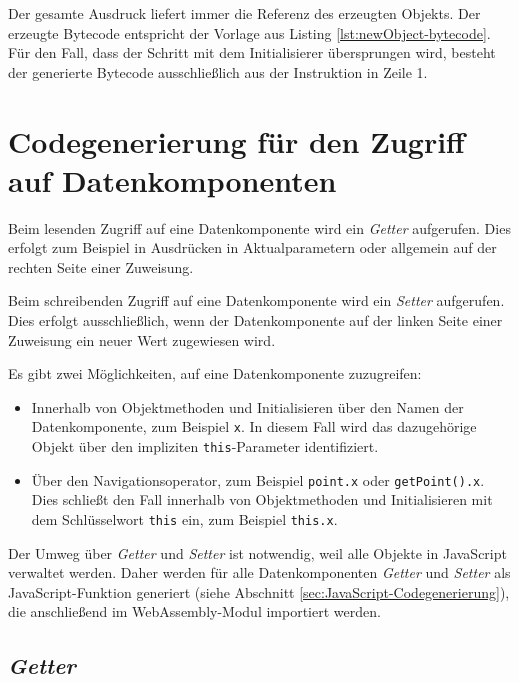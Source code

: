 Der gesamte Ausdruck liefert immer die Referenz des erzeugten Objekts. Der erzeugte Bytecode entspricht der Vorlage aus Listing \ref{lst:newObject-bytecode}. Für den Fall, dass der Schritt mit dem Initialisierer übersprungen wird, besteht der generierte Bytecode ausschließlich aus der Instruktion in Zeile 1.



\section{Codegenerierung für den Zugriff auf Datenkomponenten}

Beim lesenden Zugriff auf eine Datenkomponente wird ein \emph{Getter} aufgerufen. Dies erfolgt zum Beispiel in Ausdrücken in Aktualparametern oder allgemein auf der rechten Seite einer Zuweisung.

Beim schreibenden Zugriff auf eine Datenkomponente wird ein \emph{Setter} aufgerufen. Dies erfolgt ausschließlich, wenn der Datenkomponente auf der linken Seite einer Zuweisung ein neuer Wert zugewiesen wird.

Es gibt zwei Möglichkeiten, auf eine Datenkomponente zuzugreifen:
\begin{itemize}
    \item Innerhalb von Objektmethoden und Initialisieren über den Namen der Datenkomponente, zum Beispiel \lstinline{x}. In diesem Fall wird das dazugehörige Objekt über den impliziten \lstinline{this}-Parameter identifiziert.
    \item Über den Navigationsoperator, zum Beispiel \lstinline{point.x} oder \lstinline{getPoint().x}. Dies schließt den Fall innerhalb von Objektmethoden und Initialisieren mit dem Schlüsselwort \lstinline{this} ein, zum Beispiel \lstinline{this.x}.
\end{itemize}

Der Umweg über \emph{Getter} und \emph{Setter} ist notwendig, weil alle Objekte in JavaScript verwaltet werden. Daher werden für alle Datenkomponenten \emph{Getter} und \emph{Setter} als JavaScript-Funktion generiert (siehe Abschnitt \ref{sec:JavaScript-Codegenerierung}), die anschließend im WebAssembly-Modul importiert werden.

\subsection{\emph{Getter}}

